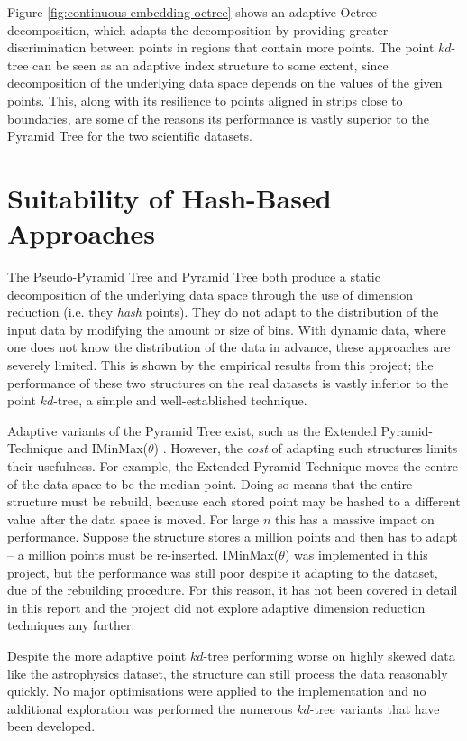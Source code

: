 Figure \ref{fig:continuous-embedding-octree} shows an adaptive Octree decomposition, which adapts the decomposition by providing greater discrimination between points in regions that contain more points. The point $kd$-tree can be seen as an adaptive index structure to some extent, since decomposition of the underlying data space depends on the values of the given points. This, along with its resilience to points aligned in strips close to boundaries, are some of the reasons its performance is vastly superior to the Pyramid Tree for the two scientific datasets.

\section{Suitability of Hash-Based Approaches}

The Pseudo-Pyramid Tree and Pyramid Tree both produce a static decomposition of the underlying data space through the use of dimension reduction (i.e. they \textit{hash} points). They do not adapt to the distribution of the input data by modifying the amount or size of bins. With dynamic data, where one does not know the distribution of the data in advance, these approaches are severely limited. This is shown by the empirical results from this project; the performance of these two structures on the real datasets is vastly inferior to the point $kd$-tree, a simple and well-established technique.

Adaptive variants of the Pyramid Tree exist, such as the Extended Pyramid-Technique \cite{pyramid-tree} and IMinMax($\theta$) \cite{iminmax}. However, the \textit{cost} of adapting such structures limits their usefulness. For example, the Extended Pyramid-Technique moves the centre of the data space to be the median point. Doing so means that the entire structure must be rebuild, because each stored point may be hashed to a different value after the data space is moved. For large $n$ this has a massive impact on performance. Suppose the structure stores a million points and then has to adapt -- a million points must be re-inserted. IMinMax($\theta$) was implemented in this project, but the performance was still poor despite it adapting to the dataset, due of the rebuilding procedure. For this reason, it has not been covered in detail in this report and the project did not explore adaptive dimension reduction techniques any further.

Despite the more adaptive point $kd$-tree performing worse on highly skewed data like the astrophysics dataset, the structure can still process the data reasonably quickly. No major optimisations were applied to the implementation and no additional exploration was performed the numerous $kd$-tree variants that have been developed.

